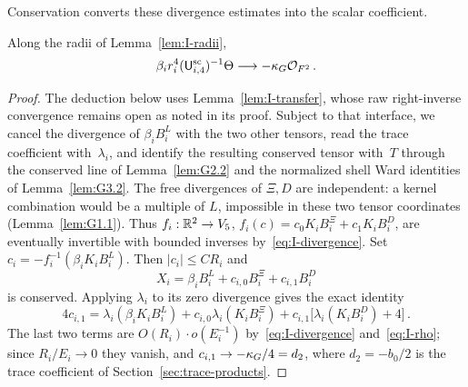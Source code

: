 Conservation converts these divergence estimates into the scalar coefficient.
\begin{proposition}\label{prop:I-coefficient}
Along the radii of Lemma~\ref{lem:I-radii},
\begin{equation}\label{eq:I-coefficient}
\beta_ir_i^4(\mathsf{U}_{i,4}^{\mathrm{sc}})^{-1}\Theta\longrightarrow-\kappa_G\mathcal{O}_{F^2}\,.
\end{equation}
\end{proposition}
\begin{proof}
The deduction below uses Lemma~\ref{lem:I-transfer}, whose raw right-inverse convergence remains open as noted in its proof. Subject to that interface, we cancel the divergence of $\beta_iB_i^L$ with the two other tensors, read the trace coefficient with~$\lambda_i$, and identify the resulting conserved tensor with~$T$ through the conserved line of Lemma~\ref{lem:G2.2} and the normalized shell Ward identities of Lemma~\ref{lem:G3.2}. The free divergences of $\Xi,D$ are independent: a kernel combination would be a multiple of $L$, impossible in these two tensor coordinates (Lemma~\ref{lem:G1.1}). Thus $f_i:\mathbb{R}^2\to V_5$, $f_i(c)=c_0K_iB_i^\Xi+c_1K_iB_i^D$, are eventually invertible with bounded inverses by~\eqref{eq:I-divergence}. Set $c_i=-f_i^{-1}(\beta_iK_iB_i^L)$. Then $|c_i|\le CR_i$ and
\begin{equation*}
X_i=\beta_iB_i^L+c_{i,0}B_i^\Xi+c_{i,1}B_i^D
\end{equation*}
is conserved. Applying $\lambda_i$ to its zero divergence gives the exact identity
\begin{equation*}
4c_{i,1}=\lambda_i(\beta_iK_iB_i^L)+c_{i,0}\lambda_i(K_iB_i^\Xi)
+c_{i,1}\big[\lambda_i(K_iB_i^D)+4\big]\,.
\end{equation*}
The last two terms are $O(R_i)\cdot o(E_i^{-1})$ by~\eqref{eq:I-divergence} and~\eqref{eq:I-rho}; since $R_i/E_i\to0$ they vanish, and $c_{i,1}\to-\kappa_G/4=d_2$, where $d_2=-b_0/2$ is the trace coefficient of Section~\ref{sec:trace-products}.


\end{proof}
